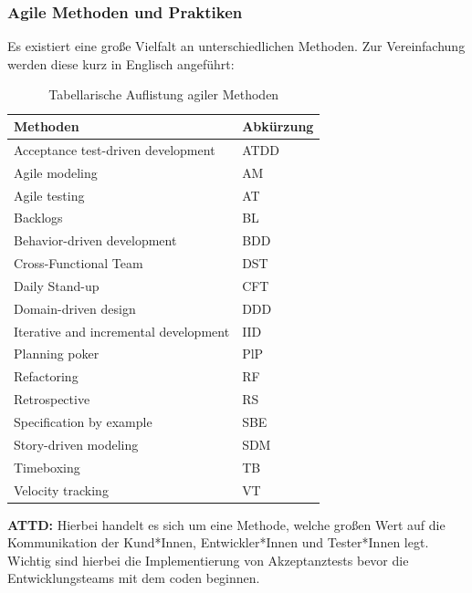 \subsubsection{Agile Methoden und Praktiken}
Es existiert eine große Vielfalt an unterschiedlichen Methoden. Zur Vereinfachung werden diese kurz in Englisch angeführt:
\begin{table}[h!]
    \centering
    \caption{Tabellarische Auflistung agiler Methoden}
    \label{tab:agile-methods}
    \begin{tabular}{|l|l|}
    \hline
    \textbf{Methoden} & \textbf{Abkürzung} \\ \hline
    Acceptance test-driven development  & ATDD                 \\ \hline
    Agile modeling    & AM                \\ \hline
    Agile testing             & AT          \\ \hline
    Backlogs & BL                \\ \hline
    Behavior-driven development & BDD                 \\ \hline
    Cross-Functional Team     & DST                \\ \hline
    Daily Stand-up    & CFT                \\ \hline
    Domain-driven design   & DDD               \\ \hline
    Iterative and incremental development    & IID               \\ \hline
    Planning poker  & PlP               \\ \hline
    Refactoring  & RF               \\ \hline
    Retrospective  & RS               \\ \hline
    Specification by example  & SBE               \\ \hline
    Story-driven modeling  & SDM               \\ \hline
    Timeboxing   & TB               \\ \hline
    Velocity tracking   & VT               \\ \hline
    \end{tabular}
\end{table} 
\newline
\textbf{ATTD:} Hierbei handelt es sich um eine Methode, welche großen Wert auf die Kommunikation der Kund*Innen, Entwickler*Innen und Tester*Innen legt. 
Wichtig sind hierbei die Implementierung von Akzeptanztests bevor die Entwicklungsteams mit dem coden beginnen. 
